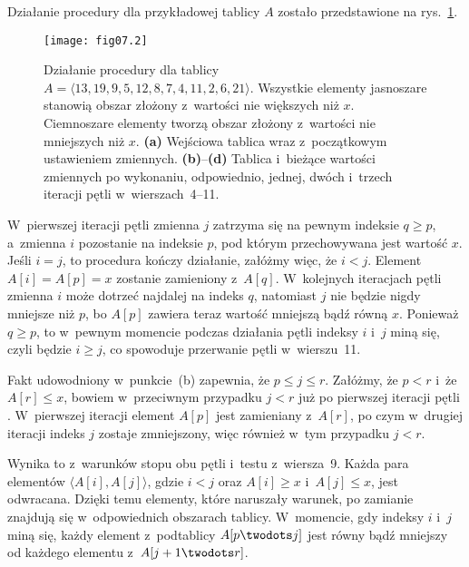 \problems


\subproblem %
Działanie procedury  dla przykładowej tablicy $A$ zostało przedstawione na rys.~\ref{fig:7-1a}.
\begin{figure}[ht]
	\begin{center}
		\texttt{[image: fig07.2]}
	\end{center}
	\caption{Działanie procedury  dla tablicy $A=\langle13,19,9,5,12,8,7,4,11,2,6,21\rangle$. Wszystkie elementy jasnoszare stanowią obszar złożony z~wartości nie większych niż $x$. Ciemnoszare elementy tworzą obszar złożony z~wartości nie mniejszych niż $x$. {\sffamily\bfseries(a)} Wejściowa tablica wraz z~początkowym ustawieniem zmiennych. {\sffamily\bfseries(b)}--{\sffamily\bfseries(d)} Tablica i~bieżące wartości zmiennych po wykonaniu, odpowiednio, jednej, dwóch i~trzech iteracji pętli  w~wierszach~4--11.} \label{fig:7-1a}
\end{figure}

\subproblem %
W~pierwszej iteracji pętli  zmienna $j$ zatrzyma się na pewnym indeksie $q\ge p$, a~zmienna $i$ pozostanie na indeksie $p$, pod którym przechowywana jest wartość $x$. Jeśli $i=j$, to procedura kończy działanie, załóżmy więc, że $i<j$. Element $A[i]=A[p]=x$ zostanie zamieniony z~$A[q]$. W~kolejnych iteracjach pętli  zmienna $i$ może dotrzeć najdalej na indeks $q$, natomiast $j$ nie będzie nigdy mniejsze niż $p$, bo $A[p]$ zawiera teraz wartość mniejszą bądź równą $x$. Ponieważ $q\ge p$, to w~pewnym momencie podczas działania pętli indeksy $i$ i~$j$ miną się, czyli będzie $i\ge j$, co spowoduje przerwanie pętli w~wierszu~11.

\subproblem %
Fakt udowodniony w~punkcie~(b) zapewnia, że $p\le j\le r$. Załóżmy, że $p<r$ i~że $A[r]\le x$, bowiem w~przeciwnym przypadku $j<r$ już po pierwszej iteracji pętli . W~pierwszej iteracji element $A[p]$ jest zamieniany z~$A[r]$, po czym w~drugiej iteracji indeks $j$ zostaje zmniejszony, więc również w~tym przypadku $j<r$.

\subproblem %
Wynika to z~warunków stopu obu pętli  i~testu z~wiersza~9. Każda para elementów $\langle A[i],A[j]\rangle$, gdzie $i<j$ oraz $A[i]\ge x$ i~$A[j]\le x$, jest odwracana. Dzięki temu elementy, które naruszały warunek, po zamianie znajdują się w~odpowiednich obszarach tablicy. W~momencie, gdy indeksy $i$ i~$j$ miną się, każdy element z~podtablicy $A[p\twodots j]$ jest równy bądź mniejszy od każdego elementu z~$A[j+1\twodots r]$.

